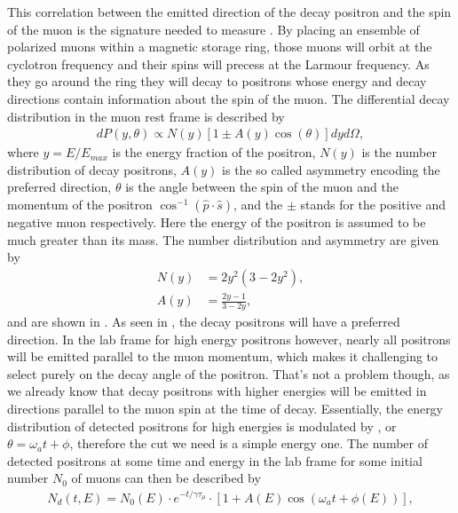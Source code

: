 This correlation between the emitted direction of the decay positron and the spin of the muon is the signature needed to measure \wa. By placing an ensemble of polarized muons within a magnetic storage ring, those muons will orbit at the cyclotron frequency and their spins will precess at the Larmour frequency. As they go around the ring they will decay to positrons whose energy and decay directions contain information about the spin of the muon. The differential decay distribution in the muon rest frame is described by \cite{Bucksbaum}
        \begin{align} \label{eq:diffdecaydist}
            dP(y, \theta) \propto N(y)[1 \pm A(y)\cos(\theta)]dy d\Omega,
        \end{align}
where $y=E/E_{max}$ is the energy fraction of the positron, $N(y)$ is the number distribution of decay positrons, $A(y)$ is the so called asymmetry encoding the preferred direction, $\theta$ is the angle between the spin of the muon and the momentum of the positron $\cos^{-1}(\hat{p} \cdot  \hat{s})$, and the $\pm$ stands for the positive and negative muon respectively. Here the energy of the positron is assumed to be much greater than its mass. The number distribution and asymmetry are given by \cite{Bucksbaum}
        \begin{align}
            N(y) &= 2y^{2}(3-2y^{2}), \label{eq:Nmrf} \\
            A(y) &= \frac{2y-1}{3-2y}, \label{eq:Amrf}
        \end{align}
and are shown in . As seen in , the decay positrons will have a preferred direction. In the lab frame for high energy positrons however, nearly all positrons will be emitted parallel to the muon momentum, which makes it challenging to select purely on the decay angle of the positron. That's not a problem though, as we already know that decay positrons with higher energies will be emitted in directions parallel to the muon spin at the time of decay. Essentially, the energy distribution of detected positrons for high energies is modulated by \wa, or $\theta = \omega_{a}t + \phi$, therefore the cut we need is a simple energy one. The number of detected positrons at some time and energy in the lab frame for some initial number $N_{0}$ of muons can then be described by
        \begin{align} \label{eq:diffdecaydist}
            N_{d}(t, E) = N_{0}(E) \cdot e^{-t/\gamma\tau_{\mu}} \cdot [1 + A(E) \cos(\omega_{a}t+\phi(E))],
        \end{align}

